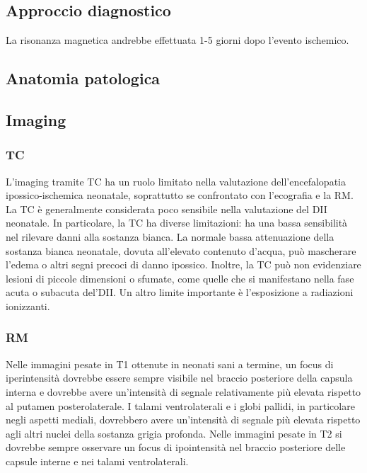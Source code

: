 \subsection{Approccio diagnostico}

La risonanza magnetica andrebbe effettuata 1-5 giorni dopo l'evento ischemico.

\subsection{Anatomia patologica}

\subsection{Imaging}

\subsubsection{TC}

L'imaging tramite TC ha un ruolo limitato nella valutazione dell'encefalopatia ipossico-ischemica neonatale, soprattutto se confrontato con l'ecografia e la RM.
La TC è generalmente considerata poco sensibile nella valutazione del DII neonatale. In particolare, la TC ha diverse limitazioni: ha una bassa sensibilità nel rilevare danni alla sostanza bianca. La normale bassa attenuazione della sostanza bianca neonatale, dovuta all'elevato contenuto d'acqua, può mascherare l'edema o altri segni precoci di danno ipossico. Inoltre, la TC può non evidenziare lesioni di piccole dimensioni o sfumate, come quelle che si manifestano nella fase acuta o subacuta del'DII. Un altro limite importante è l'esposizione a radiazioni ionizzanti.

\subsubsection{RM}
Nelle immagini pesate in T1 ottenute in neonati sani a termine, un focus di iperintensità dovrebbe essere sempre visibile nel braccio posteriore della capsula interna e dovrebbe avere un'intensità di segnale relativamente più elevata rispetto al putamen posterolaterale. I talami ventrolaterali e i globi pallidi, in particolare negli aspetti mediali, dovrebbero avere un'intensità di segnale più elevata rispetto agli altri nuclei della sostanza grigia profonda. Nelle immagini pesate in T2  si dovrebbe sempre osservare un focus di ipointensità nel braccio posteriore delle capsule interne e nei talami ventrolaterali.

